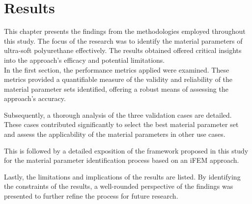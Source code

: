 
\chapter{Results} %
\label{chapter:results} %
This chapter presents the findings from the methodologies employed throughout this study.
The focus of the research was to identify the material parameters of ultra-soft polyurethane
effectively. The results obtained offered critical insights into the approach's 
efficacy and potential limitations.\\

In the first section, the performance metrics applied were examined. These metrics 
provided a quantifiable measure of the validity and reliability of the material parameter sets identified,
offering a robust means of assessing the approach's accuracy.

Subsequently, a thorough analysis of the three validation cases are detailed.
These cases contributed significantly to select the best material parameter set and 
assess the applicability of the material parameters in other use cases.

This is followed by a detailed exposition of the framework proposed in this study for the material 
parameter identification process based on an iFEM approach.

Lastly, the limitations and implications of the results are listed. By identifying the constraints 
of the results, a well-rounded perspective of the findings was presented to further refine the 
process for future research.

